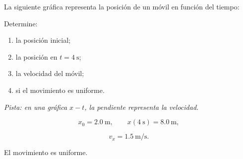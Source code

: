 \begin{ejercicio}
La siguiente gráfica representa la posición de un móvil en función del tiempo:

\begin{center}
\end{center}

Determine:

\begin{enumerate}[label=\alph*)]
    \item la posición inicial;
    \item la posición en \(t=\SI{4}{\second}\);
    \item la velocidad del móvil;
    \item si el movimiento es uniforme.
\end{enumerate}

\textit{Pista: en una gráfica \(x-t\), la pendiente representa la velocidad.}
\end{ejercicio}

\begin{respuesta}
\[
x_0=\SI{2.0}{\meter},
\qquad
x(\SI{4}{\second})=\SI{8.0}{\meter},
\]

\[
v_x=\SI{1.5}{\meter\per\second}.
\]

El movimiento es uniforme.
\end{respuesta}

